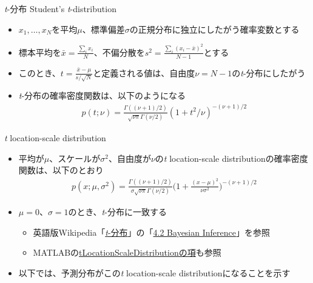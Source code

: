 \documentclass[aspectratio=169,unicode,dvipdfmx,14pt]{beamer}
\begin{document}
\begin{frame}{\textit{t}-分布 Student's \textit{t}-distribution}
\begin{itemize}
\item $x_1,\ldots,x_N$を平均$\mu$、標準偏差$\sigma$の正規分布に独立にしたがう確率変数とする
\item 標本平均を$\bar{x}=\frac{\sum_i x_i}{N}$、不偏分散を$s^2=\frac{\sum_i (x_i - \bar{x})^2}{N-1}$とする
\item このとき、$t = \frac{\bar{x} - \mu}{s / \sqrt{N}}$と定義される値は、自由度$\nu=N-1$の\textit{t}-分布にしたがう
\item \textit{t}-分布の確率密度関数は、以下のようになる
\begin{align}
p(t;\nu) = \frac{\Gamma((\nu+1)/2)}{\sqrt{\nu\pi}\Gamma(\nu/2)}(1 + t^2/\nu)^{-(\nu+1)/2}
\end{align}
\end{itemize}
\end{frame}

\begin{frame}{\textit{t} location-scale distribution}
\begin{itemize}
\item 平均が$\mu$、スケールが$\sigma^2$、自由度が$\nu$の\textit{t} location-scale distributionの確率密度関数は、以下のとおり
\begin{align}
p(x;\mu,\sigma^2) =\frac{\Gamma((\nu+1)/2)}{\sigma\sqrt{\nu\pi}\Gamma(\nu/2)} \bigg( 1 + \frac{(x - \mu)^2}{\nu\sigma^2} \bigg)^{ - (\nu+1) / 2 }
\end{align}
\item $\mu=0$、$\sigma=1$のとき、\textit{t}-分布に一致する
\begin{itemize}
\item 英語版Wikipedia「\href{https://en.wikipedia.org/wiki/Student's_t-distribution}{\textit{t}-分布}」の「\href{https://en.wikipedia.org/wiki/Student's_t-distribution\#Bayesian_inference}{4.2 Bayesian Inference}」を参照
\item MATLABの\href{https://www.mathworks.com/help/stats/prob.tlocationscaledistribution.html}{tLocationScaleDistributionの項}も参照
\end{itemize}
\item 以下では、予測分布がこの\textit{t} location-scale distributionになることを示す
\end{itemize}
\end{frame}
\end{document}
